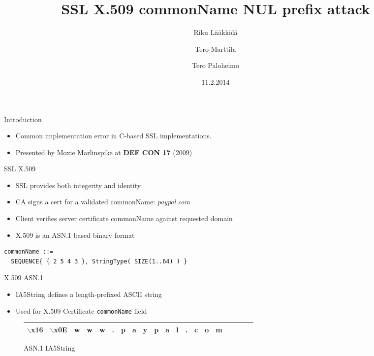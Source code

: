 \documentclass{beamer}
\title[SSL X.509 commonName attack]{SSL X.509 commonName NUL prefix attack}
\author{Riku Lääkkölä \and Tero Marttila \and Tero Paloheimo}
\institute{Aalto ELEC}
\date{11.2.2014}
\begin{document}
\begin{frame}
  	\titlepage
\end{frame}


\begin{frame}{Introduction}
	\begin{itemize}
    \item Common implementation error in C-based SSL implementations.
    \item Presented by Moxie Marlinspike at \textbf{DEF CON 17} (2009)
 	\end{itemize}
\end{frame}

\begin{frame}[fragile]{SSL X.509}
  \begin{itemize}
    \item SSL provides both integerity and identity
    \item CA signs a cert for a validated commonName: \emph{paypal.com}
    \item Client verifies server certificate commonName against requested domain
    \item X.509 is an ASN.1 based binary format
  \end{itemize}
  \begin{verbatim}
commonName ::=
  SEQUENCE{ { 2 5 4 3 }, StringType( SIZE(1..64) ) }
  \end{verbatim}
\end{frame}

\begin{frame}{X.509 ASN.1}
  \begin{itemize}
    \item IA5String defines a length-prefixed ASCII string
    \item Used for X.509 Certificate \texttt{commonName} field
  \end{itemize}
  \begin{figure}
    \begin{tabular}{*{20}{|c}}
      \hline
      $\backslash$x16 & $\backslash$x0E & w & w & w & . & p & a & y & p & a & l & . & c & o & m \\
      \hline 
    \end{tabular}
    \caption{ASN.1 IA5String}
  \end{figure}
\end{frame}
\end{document}
